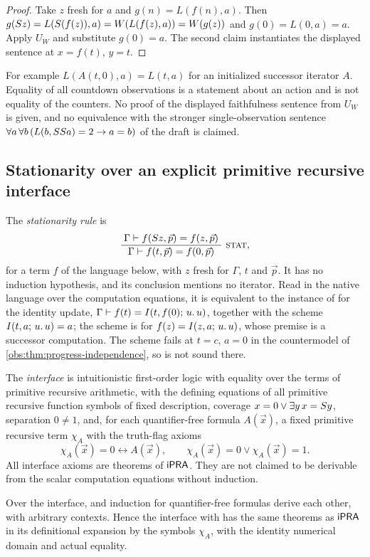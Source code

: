 \begin{proof}
Take $z$ fresh for $a$ and $g(n)=L(f(n),a)$. Then
$g(S z)=L(S(f(z)),a)=W(L(f(z),a))=W(g(z))$ and $g(0)=L(0,a)=a$. Apply
$U_W$ and substitute $g(0)=a$. The second claim instantiates the displayed
sentence at $x=f(t)$, $y=t$.
\end{proof}

For example $L(A(t,0),a)=L(t,a)$ for an initialized successor iterator $A$.
Equality of all countdown observations is a statement about an action and is
not equality of the counters. No proof of the displayed faithfulness sentence
from $U_W$ is given, and no equivalence with the stronger single-observation
sentence $\forall a\,\forall b\,(L(b,SS a)=2\to a=b)$ of the draft is
claimed.

\subsection{Stationarity over an explicit primitive recursive interface}

The \emph{stationarity rule} is
\[
\infrule{\Gamma\proves f(\Suc z,\vec p)=f(z,\vec p)}{\Gamma\proves f(t,\vec p)=f(0,\vec p)}\ \rulename{Stat},
\]
for a term $f$ of the language below, with $z$ fresh for $\Gamma$, $t$ and
$\vec p$. It has no induction hypothesis, and its conclusion mentions no
iterator. Read in the native language over the computation equations, it is
equivalent to the instance of  for the identity update,
$\Gamma\vdash f(t)=I(t,f(0);\,u.\,u)$, together with the scheme
$I(t,a;\,u.\,u)=a$; the scheme is  for
$f(z)=I(z,a;\,u.\,u)$, whose premise is a successor computation. The scheme
fails at $t=c$, $a=0$ in the countermodel of
\cref{obs:thm:progress-independence}, so  is not sound there.

The \emph{interface} is intuitionistic first-order logic with equality over
the terms of primitive recursive arithmetic, with the defining equations of
all primitive recursive function symbols of fixed description, coverage
$x=0\vee\exists y\,x=S y$, separation $0\ne 1$, and, for each
quantifier-free formula $A(\vec x)$, a fixed primitive recursive term
$\chi_A$ with the truth-flag axioms
\[
\chi_A(\vec x)=0\leftrightarrow A(\vec x),\qquad
\chi_A(\vec x)=0\vee\chi_A(\vec x)=1 .
\]
All interface axioms are theorems of $\mathsf{iPRA}$. They are not claimed to be
derivable from the scalar computation equations without induction.

\begin{proposition}
\label{obs:prop:stationary}
Over the interface,  and induction for quantifier-free formulas
derive each other, with arbitrary contexts. Hence the interface with
 has the same theorems as $\mathsf{iPRA}$ in its definitional expansion
by the symbols $\chi_A$, with the identity numerical domain and actual
equality.
\end{proposition}

